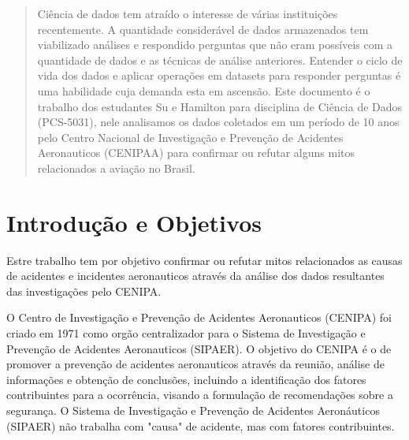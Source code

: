 \documentclass[conference]{IEEEtran}
\begin{document}




\maketitle

\begin{abstract}
Ciência de dados tem atraído o interesse de várias instituições recentemente. A quantidade considerável de dados armazenados tem viabilizado análises e respondido perguntas
que não eram possíveis com a quantidade de dados e as técnicas de análise anteriores. Entender o ciclo de vida dos dados e aplicar operações em datasets para responder
perguntas é uma habilidade cuja demanda esta em ascensão. Este documento é o trabalho dos estudantes Su e Hamilton para disciplina de Ciência de Dados (PCS-5031), nele
analisamos os dados coletados em um período de 10 anos pelo Centro Nacional de Investigação e Prevenção de Acidentes Aeronauticos (CENIPAA) para confirmar ou refutar alguns
mitos relacionados a aviação no Brasil.
\end{abstract}





%
\IEEEpeerreviewmaketitle

\section{Introdução e Objetivos}

Estre trabalho tem por objetivo confirmar ou refutar mitos relacionados as causas de acidentes e incidentes aeronauticos através da análise dos dados resultantes das 
investigações pelo CENIPA.

O Centro de Investigação e Prevenção de Acidentes Aeronauticos (CENIPA) foi criado em 1971 como orgão centralizador para o Sistema de Investigação e Prevenção de
Acidentes Aeronauticos (SIPAER). O objetivo do CENIPA é o de promover a prevenção de acidentes aeronauticos através da reunião, análise de informações e obtenção 
de conclusões, incluindo a identificação dos fatores contribuintes para a ocorrência, visando a formulação de recomendações sobre a segurança. O Sistema de Investigação
e Prevenção de Acidentes Aeronáuticos (SIPAER) não trabalha com "causa" de acidente, mas com fatores contribuintes.
\end{document}
